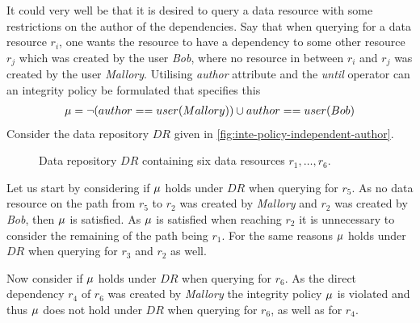 \begin{example}
It could very well be that it is desired to query a data resource with some restrictions on the author of the dependencies. Say that when querying for a data resource $r_i$, one wants the resource to have a dependency to some other resource $r_j$ which was created by the user \emph{Bob}, where no resource in between $r_i$ and $r_j$ was created by the user \emph{Mallory}. Utilising \emph{author} attribute and the \emph{until} operator can an integrity policy be formulated that specifies this
\begin{align*}
    \mu =  \lnot (author == user(Mallory)) \cup author == user(Bob)
\end{align*}
Consider the data repository $DR$ given in \autoref{fig:inte-policy-independent-author}.
\begin{figure}[!ht]
    \begin{center}
        
        \caption{Data repository $DR$ containing six data resources $r_1, \ldots, r_6$.}
        \label{fig:inte-policy-independent-author}
    \end{center}
\end{figure}
Let us start by considering if $\mu$ holds under $DR$ when querying for $r_5$. As no data resource on the path from $r_5$ to $r_2$ was created by \emph{Mallory} and $r_2$ was created by \emph{Bob}, then $\mu$ is satisfied. As $\mu$ is satisfied when reaching $r_2$ it is unnecessary to consider the remaining of the path being $r_1$. For the same reasons $\mu$ holds under $DR$ when querying for $r_3$ and $r_2$ as well.

Now consider if $\mu$ holds under $DR$ when querying for $r_6$. As the direct dependency $r_4$ of $r_6$ was created by \emph{Mallory} the integrity policy $\mu$ is violated and thus $\mu$ does not hold under $DR$ when querying for $r_6$, as well as for $r_4$.
\end{example}


